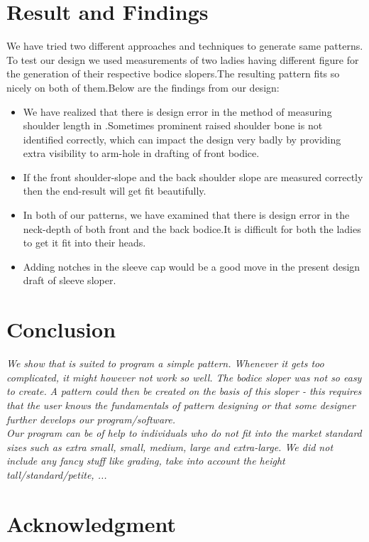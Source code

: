 \documentclass[10pt,letterpaper]{ltugboat}
\begin{document}
\section{Result and Findings}
We have tried two different approaches and techniques to generate same patterns. To test our design we used measurements of two ladies having different figure for the generation of their respective bodice slopers.The resulting pattern fits so nicely on both of them.Below are the findings from our design:
\begin{itemize}
\item	We have realized that there is design error in the method of measuring shoulder length in \cite{maddie}.Sometimes prominent raised shoulder bone is not identified correctly, which can impact the design very badly by providing extra visibility to arm-hole in drafting of front bodice.
\item If the front shoulder-slope and the back shoulder slope are measured correctly then the end-result will get fit beautifully.
\item In both of our patterns, we have examined that there is design error in the neck-depth of both front and the back bodice.It is difficult for both the ladies to get it fit into their heads.
\item Adding notches in the sleeve cap would be a good move in the present design draft of sleeve sloper.
\end{itemize}
\section{Conclusion}
\textit{We show that \MP { }is suited to program a simple pattern. Whenever it gets too complicated, it might however not work so well. The bodice sloper was not so easy to create.}
\textit{A pattern could then be created on the basis of this sloper - this requires that the user knows the fundamentals of pattern designing or that some designer further develops our program/software.}\\ 
\textit{Our program can be of help to individuals who do not fit into the market standard sizes such as extra small, small, medium, large and extra-large.
\textit{We did not include any fancy stuff like grading, take into account the height tall/standard/petite, ...}}


\section*{Acknowledgment}
\end{document}
